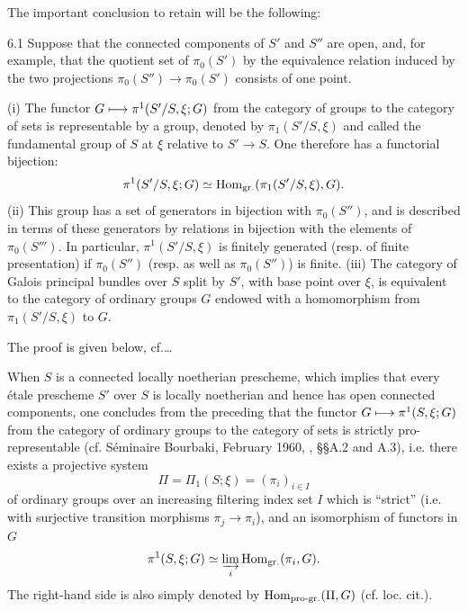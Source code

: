 The important conclusion to retain will be the following:
\begin{proposition}{6.1}\label{X.6.1}
Suppose that the connected components of $S'$ and $S''$ are open, and, for example, that the quotient set of $\pi_0(S')$ by the equivalence relation induced by the two projections $\pi_0(S'')\to\pi_0(S')$ consists of one point.

(i) The functor $G\longmapsto\pi^1(S'/S,\xi;G)$ from the category of groups to the category of sets is representable by a group, denoted by $\pi_1(S'/S,\xi)$ and called the fundamental group of $S$ at $\xi$ relative to $S'\to S$. One therefore has a functorial bijection:
\[
\pi^1(S'/S,\xi;G)\simeq\operatorname{Hom}_{\mathrm{gr.}}(\pi_1(S'/S,\xi),G).
\]
(ii) This group has a set of generators in bijection with $\pi_0(S'')$, and is described in terms of these generators by relations in bijection with the elements of $\pi_0(S''')$. In particular, $\pi^1(S'/S,\xi)$ is finitely generated (resp. of finite presentation) if $\pi_0(S'')$ (resp. as well as $\pi_0(S'')$) is finite.
(iii) The category of Galois principal bundles over $S$ split by $S'$, with base point over $\xi$, is equivalent to the category of ordinary groups $G$ endowed with a homomorphism from $\pi_1(S'/S,\xi)$ to $G$.
\end{proposition}
The proof is given below, cf.\dots

When $S$ is a connected locally noetherian prescheme, which implies that every étale prescheme $S'$ over $S$ is locally noetherian and hence has open connected components, one concludes from the preceding that the functor $G\longmapsto\pi^1(S,\xi;G)$ from the category of ordinary groups to the category of sets is strictly pro-representable (cf. Séminaire Bourbaki, February 1960, , \S\S A.2 and A.3), i.e. there exists a projective system
\[
\Pi=\Pi_1(S;\xi)=(\pi_i)_{i\in I}
\]
of ordinary groups over an increasing filtering index set $I$ which is ``strict'' (i.e. with surjective transition morphisms $\pi_j\to\pi_i$), and an isomorphism of functors in $G$
\[
\pi^1(S,\xi;G)\simeq\varinjlim_i\operatorname{Hom}_{\mathrm{gr.}}(\pi_i,G).
\]
The right-hand side is also simply denoted by $\operatorname{Hom}_{\mathrm{pro}\text{-}\mathrm{gr.}}(\Pi,G)$ (cf. loc. cit.).

